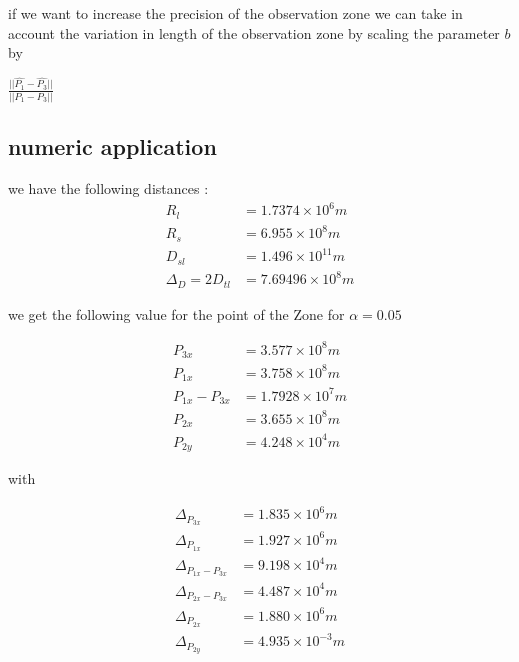 \documentclass{article} %
\begin{document}
		
		
		if we want to increase the precision of the observation zone we can take in account the variation in length of the observation zone by scaling the parameter $b$ by 
		
		
		$\frac{||\hat{P_1}-\hat{P_3}||}{||P_1-P_3||}$		
		\subsection{numeric application}
		we have the following distances : 
		$$
		\begin{align}
			R_l&=1.7374\times10^6 m \\
			R_s&=6.955\times10^8 m \\ 
			D_{sl}&=1.496\times10^{11} m \\
			\Delta_D=2D_{tl}&= 7.69496\times10^8 m
		\end{align}
		$$
		
		we get the following value for the point of the Zone for $\alpha=0.05$
		
		$$
		\begin{align}
			P_{3x}&=3.577\times10^8 m \\
			P_{1x}&=3.758\times10^8 m \\ 
			P_{1x}-P_{3x}&=1.7928\times10^7 m \\ 
			P_{2x}&=3.655\times10^8 m \\
			P_{2y}&= 4.248\times10^4 m
		\end{align}
		$$
		
		with
		
		$$
		\begin{align}
			\Delta_{P_{3x}}&=1.835\times10^6 m \\
			\Delta_{P_{1x}}&=1.927\times10^6 m \\ 
			\Delta_{P_{1x}-P_{3x}}&=9.198\times10^4 m \\ 
			\Delta_{P_{2x}-P_{3x}}&=4.487\times10^4 m \\ 
			\Delta_{P_{2x}}&=1.880\times10^6 m \\
			\Delta_{P_{2y}}&= 4.935\times10^{-3} m
		\end{align}
		$$
		
\end{document}
